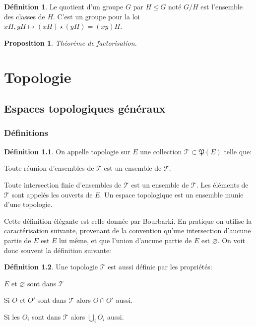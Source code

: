 \documentclass[a4paper, 11pt, french]{book}
\newenvironment{itemise}{\itemize}{\enditemize}
\let\colour=\color
\theoremstyle{plain} %
\newtheorem{proposition}{Proposition}
\theoremstyle{definition} %
\newtheorem{definition}{Définition}
\theoremstyle{remark} %
\newcommand{\1}{\mathds{1}}
\newcommand\vide{\varnothing}
\begin{document}
\begin{definition}
	Le quotient d'un groupe $G$ par $H\trianglelefteq G$ noté $G/H$ est l'ensemble des classes de $H$.
	C'est un groupe pour la loi $xH, yH\longmapsto (xH)\star(yH)=(xy)H$.
\end{definition}


\begin{proposition}
	Théorème de factorisation.
	\colour{red}{À compléter !}
\end{proposition}

\part{Topologie}

\chapter{Espaces topologiques généraux}

\section{Définitions}

\begin{definition}
	On appelle topologie sur $E$ une collection $\mathscr{T}\subset\mathfrak{P}(E)$ telle que:
	\begin{itemise}
		\item Toute réunion d'ensembles de $\mathscr{T}$ est un ensemble de $\mathscr{T}$.
		\item Toute intersection finie d'ensembles de $\mathscr{T}$ est un ensemble de $\mathscr{T}$.
	\end{itemise}
	Les éléments de $\mathscr{T}$ sont appelés les ouverts de $E$.
	Un espace topologique est un ensemble munie d'une topologie.
\end{definition}

Cette définition élégante est celle donnée par Bourbarki.
En pratique on utilise la caractérisation suivante, provenant de la convention qu'une intersection d'aucune partie de $E$ est $E$ lui même, et que l'union d'aucune partie de $E$ est $\vide$.
On voit donc souvent la définition suivante:

\begin{definition}
	Une topologie $\mathscr{T}$ est aussi définie par les propriétés:
	\begin{itemise}
		\item $E$ et $\vide$ sont dans $\mathscr{T}$
		\item Si $O$ et $O'$ sont dans $\mathscr{T}$ alors $O\cap O'$ aussi.
		\item Si les $O_i$ sont dans $\mathscr{T}$ alors $\bigcup_iO_i$ aussi.
	\end{itemise}
\end{definition}
\end{document}

